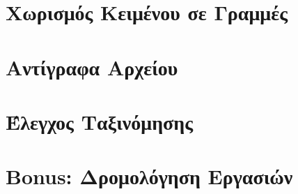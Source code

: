 \documentclass[a4paper,10pt]{article} \usepackage{anysize}
\begin{document}
\vspace{3cm}

\section{Χωρισμός Κειμένου σε Γραμμές}


\vspace{3cm}

\section{Αντίγραφα Αρχείου}


\vspace{3cm}

\section{Έλεγχος Ταξινόμησης}


\vspace{3cm}

\section{Bonus: Δρομολόγηση Εργασιών}
\end{document}
